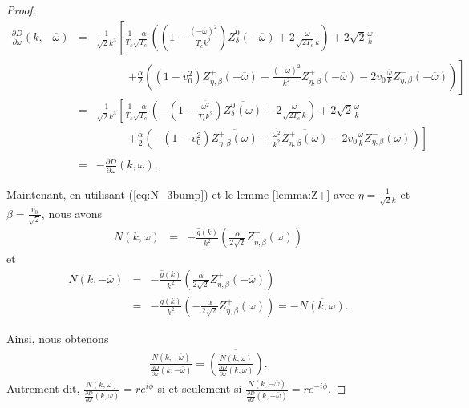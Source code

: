 \begin{proof}
\begin{eqnarray*}
    \frac{\partial D}{\partial \omega}(k,-\overline{\omega})&=&\frac{1}{\sqrt{2}k^3}\left[\frac{1-\alpha}{T_c\sqrt{T_c}}\left(\left(1-\frac{(-\overline{\omega})^2}{T_ck^2}\right)Z_\delta^0\left(-\overline{\omega}\right)+2\frac{\overline{\omega}}{\sqrt{2T_c}k}\right)+2\sqrt{2}\frac{\overline{\omega}}{k}\right.\nonumber\\
    &&~~~~~~~~~~~~~\left.+\frac{\alpha}{2}\left((1-v_0^2)Z_{\eta,\beta}^+\left(-\overline{\omega}\right)-\frac{(-\overline{\omega})^2}{k^2}Z_{\eta,\beta}^+\left(-\overline{\omega}\right)-2v_0\frac{\overline{\omega}}{k}Z_{\eta,\beta}^-\left(-\overline{\omega}\right)\right)\right]\\
    &=&\frac{1}{\sqrt{2}k^3}\left[\frac{1-\alpha}{T_c\sqrt{T_c}}\left(-\left(1-\frac{\overline{\omega^2}}{T_ck^2}\right)\overline{Z_\delta^0\left(\omega\right)}+2\frac{\overline{\omega}}{\sqrt{2T_c}k}\right)+2\sqrt{2}\frac{\overline{\omega}}{k}\right.\nonumber\\
    &&~~~~~~~~~~~~~\left.+\frac{\alpha}{2}\left(-(1-v_0^2)\overline{Z_{\eta,\beta}^+\left(\omega\right)}+\frac{\overline{\omega^2}}{k^2}\overline{Z_{\eta,\beta}^+\left(\omega\right)}-2v_0\frac{\overline{\omega}}{k}\overline{Z_{\eta,\beta}^-\left(\omega\right)}\right)\right]\nonumber\\
    &=&-\overline{\frac{\partial D}{\partial \omega}(k,\omega)}.
  \end{eqnarray*}

  Maintenant, en utilisant (\ref{eq:N_3bump}) et le lemme \ref{lemma:Z+} avec $\eta=\frac{1}{\sqrt{2}k}$ et $\beta=\frac{v_0}{\sqrt{2}}$, nous avons
  \begin{eqnarray*}
    N(k,\omega)&=&-\frac{\hat{g}(k)}{k^2}\left(\frac{\alpha}{2\sqrt{2}}Z_{\eta,\beta}^+\left(\omega\right)\right)
  \end{eqnarray*}
  et
  \begin{eqnarray*}
    N(k,-\overline{\omega})&=&-\frac{\hat{g}(k)}{k^2}\left(\frac{\alpha}{2\sqrt{2}}Z_{\eta,\beta}^+\left(-\overline{\omega}\right)\right)\\
    &=&-\frac{\hat{g}(k)}{k^2}\left(-\frac{\alpha}{2\sqrt{2}}\overline{Z_{\eta,\beta}^+\left(\omega\right)}\right)=-\overline{N(k,\omega)}.
  \end{eqnarray*}

  Ainsi, nous obtenons 
  \begin{eqnarray*}
    \frac{N(k,-\overline{\omega})}{\frac{\partial D}{\partial \omega}(k,-\overline{\omega})}=\overline{\left(\frac{N(k,\omega)}{\frac{\partial D}{\partial \omega}(k,\omega)}\right)}.
  \end{eqnarray*}
  Autrement dit, $\frac{N(k,\omega)}{\frac{\partial D}{\partial \omega}(k,\omega)}=re^{i\phi}$ si et seulement si $\frac{N(k,-\overline{\omega})}{\frac{\partial D}{\partial \omega}(k,-\overline{\omega})}=re^{-i\phi}$.
\end{proof}

